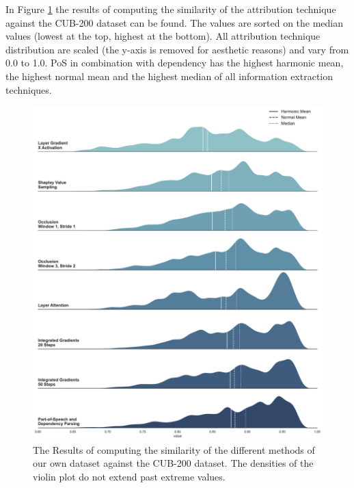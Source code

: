 \documentclass[a4paper, 12pt, oneside]{book} %
\begin{document}
In Figure \ref{fig:hmean_violin} the results of computing the similarity of the attribution technique against the CUB-200 dataset can be found.
The values are sorted on the median values (lowest at the top, highest at the bottom).
All attribution technique distribution are scaled (the y-axis is removed for aesthetic reasons) and vary from 0.0 to 1.0.
PoS in combination with dependency has the highest harmonic mean, the highest normal mean and the highest median of all information extraction techniques.
\begin{figure}[htpb]
 \centering
 \includegraphics[width=\textwidth]{figures/densities.pdf}
 \caption[Similarity results]{The Results of computing the similarity of the different methods of our own dataset against the CUB-200 dataset. The densities of the violin plot do not extend past extreme values.}
 \label{fig:hmean_violin}
\end{figure}
\end{document}
